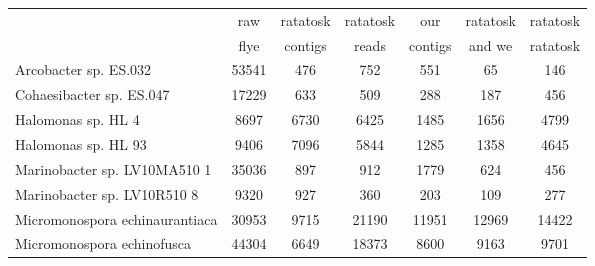 \begin{minipage}{0.91\textwidth}
\begin{adjustbox}{center}
\begin{tabular}{|l||c|c|c|c|c|c|}
\hline
 & raw & ratatosk & ratatosk & our & ratatosk & ratatosk \\
 & flye & contigs & reads & contigs & and we & ratatosk \\
\hline
\hline
Arcobacter sp. ES.032 & \cellcolor[RGB]{235, 71, 71} 53541 & \cellcolor[RGB]{250, 250, 254} 476 & \cellcolor[RGB]{251, 223, 223} 752 & \cellcolor[RGB]{254, 250, 250} 551 & \cellcolor[RGB]{214, 214, 250} 65 & \cellcolor[RGB]{218, 218, 251} 146 \\
\hline
Cohaesibacter sp. ES.047 & \cellcolor[RGB]{235, 71, 71} 17229 & \cellcolor[RGB]{251, 218, 218} 633 & \cellcolor[RGB]{254, 250, 250} 509 & \cellcolor[RGB]{223, 223, 251} 288 & \cellcolor[RGB]{205, 205, 249} 187 & \cellcolor[RGB]{250, 250, 254} 456 \\
\hline
Halomonas sp. HL 4 & \cellcolor[RGB]{251, 218, 218} 8697 & \cellcolor[RGB]{253, 241, 241} 6730 & \cellcolor[RGB]{254, 246, 246} 6425 & \cellcolor[RGB]{223, 223, 251} 1485 & \cellcolor[RGB]{223, 223, 251} 1656 & \cellcolor[RGB]{250, 250, 254} 4799 \\
\hline
Halomonas sp. HL 93 & \cellcolor[RGB]{249, 205, 205} 9406 & \cellcolor[RGB]{252, 232, 232} 7096 & \cellcolor[RGB]{254, 246, 246} 5844 & \cellcolor[RGB]{223, 223, 251} 1285 & \cellcolor[RGB]{223, 223, 251} 1358 & \cellcolor[RGB]{250, 250, 254} 4645 \\
\hline
Marinobacter sp. LV10MA510 1 & \cellcolor[RGB]{235, 71, 71} 35036 & \cellcolor[RGB]{255, 255, 255} 897 & \cellcolor[RGB]{255, 255, 255} 912 & \cellcolor[RGB]{235, 71, 71} 1779 & \cellcolor[RGB]{218, 218, 251} 624 & \cellcolor[RGB]{195, 195, 248} 456 \\
\hline
Marinobacter sp. LV10R510 8 & \cellcolor[RGB]{235, 71, 71} 9320 & \cellcolor[RGB]{235, 71, 71} 927 & \cellcolor[RGB]{253, 241, 241} 360 & \cellcolor[RGB]{223, 223, 251} 203 & \cellcolor[RGB]{200, 200, 249} 109 & \cellcolor[RGB]{246, 246, 254} 277 \\
\hline
Micromonospora echinaurantiaca & \cellcolor[RGB]{235, 71, 71} 30953 & \cellcolor[RGB]{186, 186, 247} 9715 & \cellcolor[RGB]{235, 71, 71} 21190 & \cellcolor[RGB]{227, 227, 252} 11951 & \cellcolor[RGB]{241, 241, 253} 12969 & \cellcolor[RGB]{253, 241, 241} 14422 \\
\hline
Micromonospora echinofusca & \cellcolor[RGB]{235, 71, 71} 44304 & \cellcolor[RGB]{94, 94, 237} 6649 & \cellcolor[RGB]{235, 71, 71} 18373 & \cellcolor[RGB]{223, 223, 251} 8600 & \cellcolor[RGB]{246, 246, 254} 9163 & \cellcolor[RGB]{253, 241, 241} 9701 \\

\end{tabular}
\end{adjustbox}
\end{minipage}
